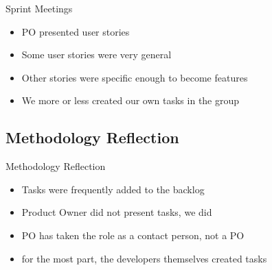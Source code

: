 \begin{frame}{Sprint Meetings}
\begin{itemize} 
	\item PO presented user stories
    \item Some user stories were very general
    \item Other stories were specific enough to become features
    \item We more or less created our own tasks in the group
\end{itemize}
\end{frame}

\subsection{Methodology Reflection}
\begin{frame}{Methodology Reflection}
\begin{itemize} 
	\item Tasks were frequently added to the backlog
    \item Product Owner did not present tasks, we did
    \item PO has taken the role as a contact person, not a PO
    \item for the most part, the developers themselves created tasks
\end{itemize}
\end{frame}
















